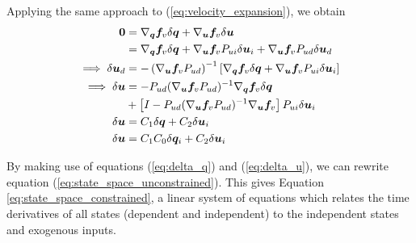 \documentclass[smallcondensed,final]{svjour3}                     %
\begin{document}
Applying the same approach to (\ref{eq:velocity_expansion}), we obtain
\begin{align}
  \bm{0} &= \nabla_{\bm{q}}\bm{f}_{v} \delta \bm{q} +
  \nabla_{\bm{u}}\bm{f}_{v} \delta \bm{u}\notag\\
  &= \nabla_{\bm{q}} \bm{f}_{v}
\delta \bm{q} + \nabla_{\bm{u}} \bm{f}_{v} P_{ui} \delta \bm{u}_i +
\nabla_{\bm{u}} \bm{f}_{v} P_{ud} \delta \bm{u}_d \notag\\
\implies \delta \bm{u}_d &= -\left(\nabla_{\bm{u}} \bm{f}_{v}
P_{ud}\right)^{-1}\left[\nabla_{\bm{q}}\bm{f}_{v} \delta\bm{q} +
  \nabla_{\bm{u}} \bm{f}_{v} P_{ui} \delta \bm{u}_i \right]\notag\\
  \implies \delta \bm{u} &= -P_{ud}(\nabla_{\bm{u}} \bm{f}_{v} P_{ud})^{-1}
  \nabla_{\bm{q}} \bm{f}_{v} \delta \bm{q}\notag\\
  &+ \left[I - P_{ud} (\nabla_{\bm{u}}\bm{f}_{v} P_{ud})^{-1} \nabla_{\bm{u}}
    \bm{f}_{v} \right] P_{ui} \delta \bm{u}_i\\
  \delta \bm{u} &= C_1 \delta \bm{q} + C_2 \delta \bm{u}_i\notag\\
  \label{eq:delta_u}
  \delta \bm{u} &= C_1 C_0 \delta \bm{q}_i + C_2 \delta \bm{u}_i
\end{align}

By making use of equations (\ref{eq:delta_q}) and (\ref{eq:delta_u}), we can
rewrite equation (\ref{eq:state_space_unconstrained}).  This gives Equation
\ref{eq:state_space_constrained}, a linear system of equations which relates
the time derivatives of all states (dependent and independent) to the
independent states and exogenous inputs.
\end{document}
